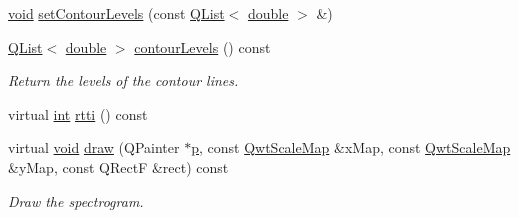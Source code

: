 \begin{DoxyCompactItemize}
\item 
\hyperlink{group___u_a_v_objects_plugin_ga444cf2ff3f0ecbe028adce838d373f5c}{void} \hyperlink{class_qwt_plot_spectrogram_a5b7669a3c390e30f0c51e5c4689095d2}{set\-Contour\-Levels} (const \hyperlink{class_q_list}{Q\-List}$<$ \hyperlink{_super_l_u_support_8h_a8956b2b9f49bf918deed98379d159ca7}{double} $>$ \&)
\item 
\hyperlink{class_q_list}{Q\-List}$<$ \hyperlink{_super_l_u_support_8h_a8956b2b9f49bf918deed98379d159ca7}{double} $>$ \hyperlink{class_qwt_plot_spectrogram_a850b6b098d5859ee96e6f7cd9e05509f}{contour\-Levels} () const 
\begin{DoxyCompactList}\small\item\em Return the levels of the contour lines. \end{DoxyCompactList}\item 
virtual \hyperlink{ioapi_8h_a787fa3cf048117ba7123753c1e74fcd6}{int} \hyperlink{class_qwt_plot_spectrogram_a01197466f530633759337bbb7b8f7504}{rtti} () const 
\item 
virtual \hyperlink{group___u_a_v_objects_plugin_ga444cf2ff3f0ecbe028adce838d373f5c}{void} \hyperlink{class_qwt_plot_spectrogram_a92bafff167caeef9e1e4a6e652c0c5d4}{draw} (Q\-Painter $\ast$\hyperlink{glext_8h_aa5367c14d90f462230c2611b81b41d23}{p}, const \hyperlink{class_qwt_scale_map}{Qwt\-Scale\-Map} \&x\-Map, const \hyperlink{class_qwt_scale_map}{Qwt\-Scale\-Map} \&y\-Map, const Q\-Rect\-F \&rect) const 
\begin{DoxyCompactList}\small\item\em Draw the spectrogram. \end{DoxyCompactList}\end{DoxyCompactItemize}
